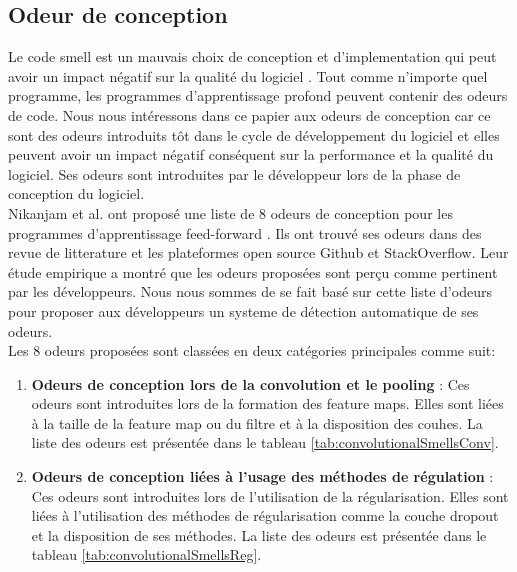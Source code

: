 \subsection{Odeur de conception}
\label{sec:codeSmell}
Le code smell est un mauvais choix de conception et d'implementation qui peut
avoir un impact négatif sur la qualité du logiciel \cite{fowler1997refactoring}.
Tout comme n'importe quel programme, les programmes d'apprentissage profond
peuvent contenir des odeurs de code. Nous nous intéressons dans ce papier aux
odeurs de conception car ce sont des odeurs introduits tôt dans le cycle de
développement du logiciel et elles peuvent avoir un impact négatif conséquent
sur la performance et la qualité du logiciel. Ses odeurs sont introduites par le
développeur lors de la phase de  conception du logiciel.\\ Nikanjam et al. ont
proposé une liste de 8 odeurs de conception pour les programmes d'apprentissage
feed-forward \cite{nikanjam2019deep}. Ils ont trouvé ses odeurs dans des revue
de litterature et les plateformes open source Github et StackOverflow. Leur étude empirique a montré que les
odeurs proposées sont perçu comme pertinent par les développeurs. Nous nous
sommes de se fait basé sur cette liste d'odeurs pour proposer aux développeurs
un systeme de détection automatique de ses odeurs.\\ Les 8 odeurs proposées sont
classées en deux catégories principales comme suit:
\begin{enumerate}
    \item \textbf{Odeurs de conception lors de la convolution et le pooling} : Ces
          odeurs sont introduites lors de la formation des feature maps. Elles sont liées
          à la taille de la feature map ou du filtre et à la disposition des couhes. La liste des odeurs est présentée dans le tableau \ref{tab:convolutionalSmellsConv}.
    \item \textbf{Odeurs de conception liées à l'usage des méthodes de régulation} : Ces odeurs sont
          introduites lors de l'utilisation de la régularisation. Elles sont liées à
          l'utilisation des méthodes de régularisation comme la couche dropout et la
          disposition de ses méthodes. La liste des odeurs est présentée dans le tableau \ref{tab:convolutionalSmellsReg}.
\end{enumerate}


